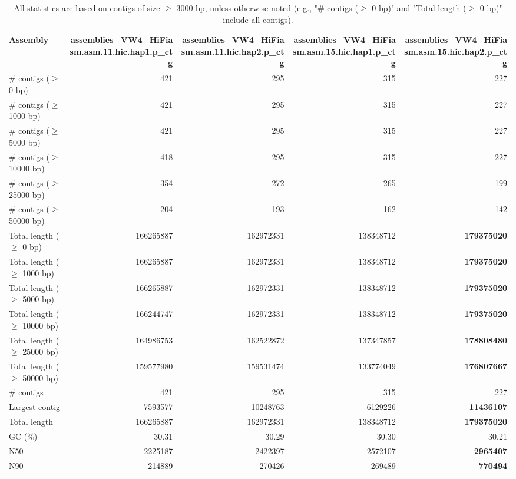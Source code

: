 \documentclass[12pt,a4paper]{article}
\begin{document}
\begin{table}[ht]
\begin{center}
\caption{All statistics are based on contigs of size $\geq$ 3000 bp, unless otherwise noted (e.g., "\# contigs ($\geq$ 0 bp)" and "Total length ($\geq$ 0 bp)" include all contigs).}
\begin{tabular}{|l*{4}{|r}|}
\hline
Assembly & assemblies\_VW4\_HiFiasm.asm.11.hic.hap1.p\_ctg & assemblies\_VW4\_HiFiasm.asm.11.hic.hap2.p\_ctg & assemblies\_VW4\_HiFiasm.asm.15.hic.hap1.p\_ctg & assemblies\_VW4\_HiFiasm.asm.15.hic.hap2.p\_ctg \\ \hline
\# contigs ($\geq$ 0 bp) & 421 & 295 & 315 & 227 \\ \hline
\# contigs ($\geq$ 1000 bp) & 421 & 295 & 315 & 227 \\ \hline
\# contigs ($\geq$ 5000 bp) & 421 & 295 & 315 & 227 \\ \hline
\# contigs ($\geq$ 10000 bp) & 418 & 295 & 315 & 227 \\ \hline
\# contigs ($\geq$ 25000 bp) & 354 & 272 & 265 & 199 \\ \hline
\# contigs ($\geq$ 50000 bp) & 204 & 193 & 162 & 142 \\ \hline
Total length ($\geq$ 0 bp) & 166265887 & 162972331 & 138348712 & {\bf 179375020} \\ \hline
Total length ($\geq$ 1000 bp) & 166265887 & 162972331 & 138348712 & {\bf 179375020} \\ \hline
Total length ($\geq$ 5000 bp) & 166265887 & 162972331 & 138348712 & {\bf 179375020} \\ \hline
Total length ($\geq$ 10000 bp) & 166244747 & 162972331 & 138348712 & {\bf 179375020} \\ \hline
Total length ($\geq$ 25000 bp) & 164986753 & 162522872 & 137347857 & {\bf 178808480} \\ \hline
Total length ($\geq$ 50000 bp) & 159577980 & 159531474 & 133774049 & {\bf 176807667} \\ \hline
\# contigs & 421 & 295 & 315 & 227 \\ \hline
Largest contig & 7593577 & 10248763 & 6129226 & {\bf 11436107} \\ \hline
Total length & 166265887 & 162972331 & 138348712 & {\bf 179375020} \\ \hline
GC (\%) & 30.31 & 30.29 & 30.30 & 30.21 \\ \hline
N50 & 2225187 & 2422397 & 2572107 & {\bf 2965407} \\ \hline
N90 & 214889 & 270426 & 269489 & {\bf 770494} \\ \hline

\end{tabular}
\end{center}
\end{table}
\end{document}
